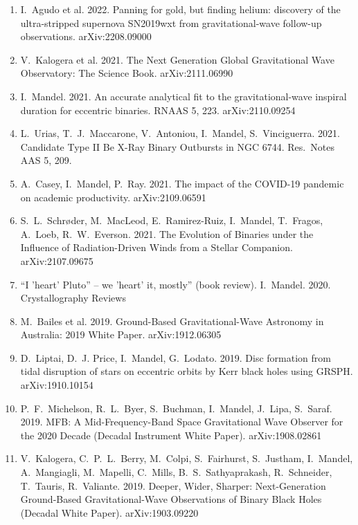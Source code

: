 \documentclass[margin,line]{res}
\begin{document}
\begin{resume}
\begin{enumerate}
\item I.~Agudo et al. 2022.  Panning for gold, but finding helium: discovery of the ultra-stripped supernova SN2019wxt from gravitational-wave follow-up observations.  arXiv:2208.09000

\item V.~Kalogera et al.  2021. The Next Generation Global Gravitational Wave Observatory: The Science Book.  arXiv:2111.06990

\item I.~Mandel.  2021.  An accurate analytical fit to the gravitational-wave inspiral duration for eccentric binaries. RNAAS 5, 223. arXiv:2110.09254

\item L.~Urias, T.~J.~Maccarone, V.~Antoniou, I.~Mandel, S.~Vinciguerra.  2021.  Candidate Type II Be X-Ray Binary Outbursts in NGC 6744.  Res.~Notes AAS 5, 209.

\item A.~Casey, I.~Mandel, P.~Ray. 2021. The impact of the COVID-19 pandemic on academic productivity.  arXiv:2109.06591

\item S.~L.~Schr{\o}der, M.~MacLeod, E.~Ramirez-Ruiz, I.~Mandel, T.~Fragos, A.~Loeb, R.~W.~Everson. 2021. The Evolution of Binaries under the Influence of Radiation-Driven Winds
  from a Stellar Companion.  arXiv:2107.09675

\item ``I 'heart' Pluto'' -- we 'heart' it, mostly'' (book review).  I.~Mandel.  2020.  Crystallography Reviews

\item M.~Bailes et al. 2019. Ground-Based Gravitational-Wave Astronomy in Australia: 2019 White Paper. arXiv:1912.06305

\item D.~Liptai, D.~J. Price, I.~Mandel, G.~Lodato.  2019.  Disc formation from tidal disruption of stars on eccentric orbits by Kerr black holes using GRSPH.  arXiv:1910.10154

\item P.~F.~Michelson, R.~L.~Byer, S.~Buchman, I.~Mandel, J.~Lipa, S.~Saraf.  2019. MFB: A Mid-Frequency-Band Space Gravitational Wave Observer for the 2020 Decade (Decadal Instrument White Paper). arXiv:1908.02861 

\item V.~Kalogera, C.~P.~L.~Berry, M.~Colpi, S.~Fairhurst, S.~Justham, I.~Mandel, A.~Mangiagli, M.~Mapelli, C.~Mills, B.~S.~Sathyaprakash, R.~Schneider, T.~Tauris, R.~Valiante. 2019.  Deeper, Wider, Sharper: Next-Generation Ground-Based Gravitational-Wave Observations of Binary Black Holes (Decadal White Paper).  arXiv:1903.09220 


\end{enumerate}
\end{resume}
\end{document}
